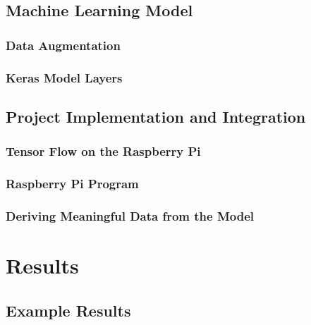 \documentclass[11pt]{article}
\begin{document}
        \subsection{Machine Learning Model}
            \subsubsection{Data Augmentation} %

            \subsubsection{Keras Model Layers}

        \subsection{Project Implementation and Integration}
            \subsubsection{Tensor Flow on the Raspberry Pi}

            \subsubsection{Raspberry Pi Program}

            \subsubsection{Deriving Meaningful Data from the Model}

    \FloatBarrier
    \section{Results}
        \subsection{Example Results}
\end{document}
